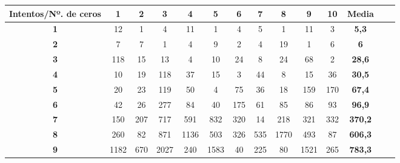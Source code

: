 \documentclass[10pt,a4paper,spanish]{report}
\begin{document}
\begin{table}[h!]
 \centering
 \begin{adjustbox}{max width=\textwidth}
  \begin{tabular}{*{14}{|c}|} %
   \hline
   \textbf{Intentos/Nº. de ceros} & \textbf{1} & \textbf{2} & \textbf{3} & \textbf{4} & \textbf{5} & \textbf{6} & \textbf{7} & \textbf{8} & \textbf{9} & \textbf{10} & \textbf{Media}      \\ \hline
   \textbf{1}                     & 12         & 1          & 4          & 11         & 1          & 4          & 5          & 1          & 11         & 3           & \textbf{5,3}        \\ \hline
   \textbf{2}                     & 7          & 7          & 1          & 4          & 9          & 2          & 4          & 19         & 1          & 6           & \textbf{6}          \\ \hline
   \textbf{3}                     & 118        & 15         & 13         & 4          & 10         & 24         & 8          & 24         & 68         & 2           & \textbf{28,6}       \\ \hline
   \textbf{4}                     & 10         & 19         & 118        & 37         & 15         & 3          & 44         & 8          & 15         & 36          & \textbf{30,5}       \\ \hline
   \textbf{5}                     & 20         & 23         & 119        & 50         & 4          & 75         & 36         & 18         & 159        & 170         & \textbf{67,4}       \\ \hline
   \textbf{6}                     & 42         & 26         & 277        & 84         & 40         & 175        & 61         & 85         & 86         & 93          & \textbf{96,9}       \\ \hline
   \textbf{7}                     & 150        & 207        & 717        & 591        & 832        & 320        & 14         & 218        & 321        & 332         & \textbf{370,2}      \\ \hline
   \textbf{8}                     & 260        & 82         & 871        & 1136       & 503        & 326        & 535        & 1770       & 493        & 87          & \textbf{606,3}      \\ \hline
   \textbf{9}                     & 1182       & 670        & 2027       & 240        & 1583       & 40         & 225        & 80         & 1521       & 265         & \textbf{783,3}      \\ \hline

\end{tabular}
\end{adjustbox}
\end{table}
\end{document}
